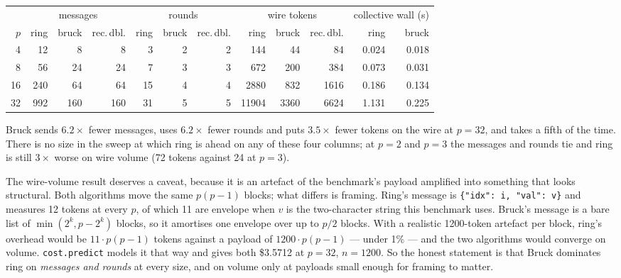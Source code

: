 \documentclass[11pt]{article}
\begin{document}
\begin{center}\footnotesize
\begin{tabular}{@{}rrrrrrrrrrrr@{}}
\toprule
  & \multicolumn{3}{c}{messages} & \multicolumn{3}{c}{rounds} & \multicolumn{3}{c}{wire tokens} & \multicolumn{2}{c}{collective wall (s)} \\
  \cmidrule(r){2-4}\cmidrule(r){5-7}\cmidrule(r){8-10}\cmidrule(r){11-12}
  $p$ & ring & bruck & rec.\,dbl. & ring & bruck & rec.\,dbl. & ring & bruck & rec.\,dbl. & ring & bruck \\
\midrule
  4  & 12  & 8   & 8   & 3  & 2 & 2 & 144    & 44   & 84   & 0.024 & 0.018 \\
  8  & 56  & 24  & 24  & 7  & 3 & 3 & 672    & 200  & 384  & 0.073 & 0.031 \\
  16 & 240 & 64  & 64  & 15 & 4 & 4 & 2880   & 832  & 1616 & 0.186 & 0.134 \\
  32 & 992 & 160 & 160 & 31 & 5 & 5 & 11904  & 3360 & 6624 & 1.131 & 0.225 \\
\bottomrule
\end{tabular}\normalsize
\end{center}

\noindent
Bruck sends $6.2\times$ fewer messages, uses $6.2\times$ fewer rounds and puts $3.5\times$ fewer
tokens on the wire at $p=32$, and takes a fifth of the time. There is no size in the sweep at
which ring is ahead on any of these four columns; at $p=2$ and $p=3$ the messages and rounds tie
and ring is still $3\times$ worse on wire volume (72 tokens against 24 at $p=3$).

The wire-volume result deserves a caveat, because it is an artefact of the benchmark's payload
amplified into something that looks structural. Both algorithms move the same $p(p-1)$ blocks;
what differs is framing. Ring's message is \texttt{\{"idx": i, "val": v\}} and measures 12 tokens
at every $p$, of which 11 are envelope when $v$ is the two-character string this benchmark uses.
Bruck's message is a bare list of $\min(2^k, p-2^k)$ blocks, so it amortises one envelope over up
to $p/2$ blocks. With a realistic 1200-token artefact per block, ring's overhead would be
$11 \cdot p(p-1)$ tokens against a payload of $1200 \cdot p(p-1)$ --- under 1\% --- and the two
algorithms would converge on volume. \texttt{cost.predict} models it that way and gives both
\$3.5712 at $p=32$, $n=1200$. So the honest statement is that Bruck dominates ring on
\emph{messages and rounds} at every size, and on volume only at payloads small enough for framing
to matter.
\end{document}

